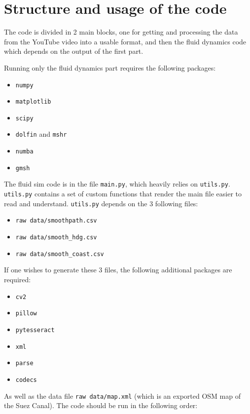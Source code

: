 \documentclass[a4paper]{article}
\begin{document}
\newpage
\appendix
\section{Structure and usage of the code}
The code is divided in 2 main blocks, one for getting and processing the data from the YouTube video\cite{goodvideo} into a usable format, and then the fluid dynamics code which depends on the output of the first part. 

Running only the fluid dynamics part requires the following packages:
\begin{itemize}
	\item \texttt{numpy}
	\item \texttt{matplotlib}
	\item \texttt{scipy}
	\item \texttt{dolfin} and \texttt{mshr}
	\item \texttt{numba}
	\item \texttt{gmsh}
\end{itemize}
The fluid sim code is in the file \texttt{main.py}, which heavily relies on \texttt{utils.py}. \texttt{utils.py} contains a set of custom functions that render the main file easier to read and understand. \texttt{utils.py} depends on the 3 following files:
\begin{itemize}
	\item \texttt{raw data/smoothpath.csv}
	\item \texttt{raw data/smooth\_hdg.csv}
	\item \texttt{raw data/smooth\_coast.csv}
\end{itemize} 
If one wishes to generate these 3 files, the following additional packages are required:
\begin{itemize}
	\item \texttt{cv2}
	\item \texttt{pillow}
	\item \texttt{pytesseract}
	\item \texttt{xml}
	\item \texttt{parse}
	\item \texttt{codecs}
\end{itemize}
As well as the data file \texttt{raw data/map.xml} (which is an exported OSM map of the Suez Canal). The code should be run in the following order:
\end{document}
